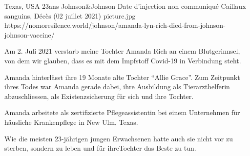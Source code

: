           {Texas, USA}
          {23ans}
          {Johnson\&Johnson}
          {Date d'injection non communiqué}
          {Caillaux sanguins,
          Décès (02 juillet 2021)}
          {picture.jpg}
          {https://nomoresilence.world/johnson/amanda-lyn-rich-died-from-johnson-johnson-vaccine/}
          {

Am 2. Juli 2021 verstarb meine Tochter Amanda Rich an einem Blutgerinnsel, von
dem wir glauben, dass es mit dem Impfstoff Covid-19 in Verbindung steht.

Amanda hinterlässt ihre 19 Monate alte Tochter “Allie Grace”. Zum Zeitpunkt
ihres Todes war Amanda gerade dabei, ihre Ausbildung als Tierarzthelferin
abzuschliessen, als Existenzsicherung für sich und ihre Tochter.

Amanda arbeitete als zertifizierte Pflegeassistentin bei einem Unternehmen für
häusliche Krankenpflege in New Ulm, Texas.

Wie die meisten 23-jährigen jungen Erwachsenen hatte auch sie nicht vor zu
sterben, sondern zu leben und für ihreTochter das Beste zu tun.

}
